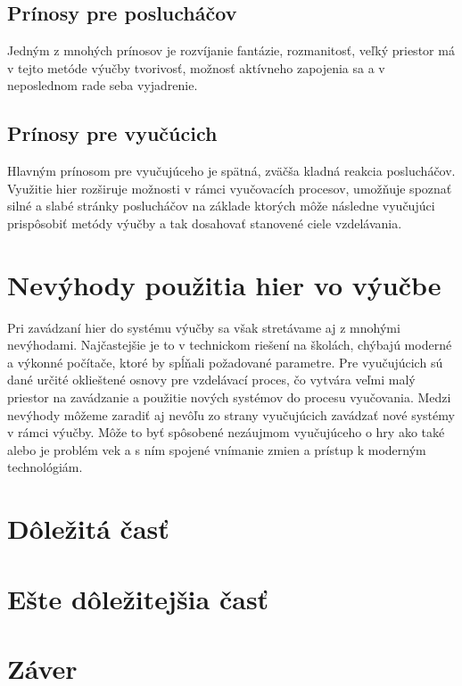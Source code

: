 \documentclass[10pt,twoside,slovak,a4paper]{article}
\begin{document}
\subsection{Prínosy pre poslucháčov}

Jedným z mnohých prínosov je rozvíjanie fantázie, rozmanitosť, veľký priestor má v tejto metóde výučby tvorivosť, možnosť aktívneho zapojenia sa a v neposlednom rade seba vyjadrenie.

\subsection{Prínosy pre vyučúcich}

Hlavným prínosom pre vyučujúceho je spätná, zväčša kladná reakcia poslucháčov. Využitie hier rozširuje možnosti v rámci vyučovacích procesov, umožňuje spoznať silné a slabé stránky poslucháčov na základe ktorých môže následne vyučujúci prispôsobiť metódy výučby a tak dosahovať stanovené ciele vzdelávania.

\section{Nevýhody použitia hier vo výučbe}

Pri zavádzaní hier do systému výučby sa však stretávame aj z mnohými nevýhodami. Najčastejšie je to v technickom riešení na školách, chýbajú moderné a výkonné počítače, ktoré by spĺňali požadované parametre. Pre vyučujúcich sú dané určité oklieštené osnovy pre vzdelávací proces, čo vytvára veľmi malý priestor na zavádzanie a použitie nových systémov do procesu vyučovania.  Medzi nevýhody môžeme zaradiť aj nevôľu zo strany vyučujúcich zavádzať nové systémy v rámci výučby. Môže to byť spôsobené nezáujmom vyučujúceho o hry ako také alebo je problém vek a s ním spojené vnímanie zmien a prístup k moderným technológiám.


\section{Dôležitá časť} \label{dolezita}




\section{Ešte dôležitejšia časť} \label{dolezitejsia}




\section{Záver} \label{zaver} %





\end{document}
